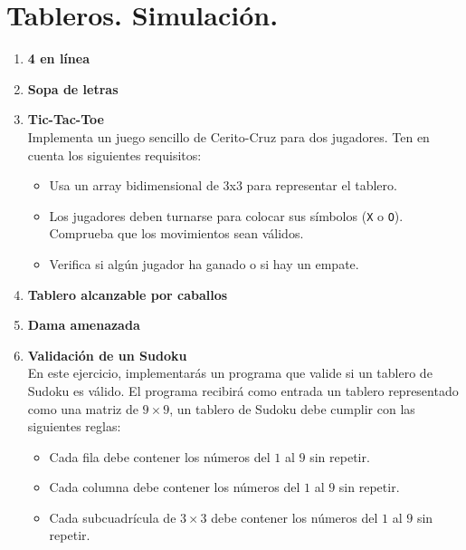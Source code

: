 \section{Tableros. Simulación.}
\begin{enumerate}
    \item \textbf{4 en línea}\\
    

    \item \textbf{Sopa de letras}\\
    

    \item \textbf{Tic-Tac-Toe}\\
    Implementa un juego sencillo de Cerito-Cruz para dos jugadores. Ten en cuenta los siguientes requisitos:
    \begin{itemize}
        \item Usa un array bidimensional de 3x3 para representar el tablero.
        \item Los jugadores deben turnarse para colocar sus símbolos (\texttt{X} o \texttt{O}). Comprueba que los movimientos sean válidos.
        \item Verifica si algún jugador ha ganado o si hay un empate.
    \end{itemize}

    \item \textbf{Tablero alcanzable por caballos}\\
    

    \item \textbf{Dama amenazada}\\
    

    \item \textbf{Validación de un Sudoku}\\
    En este ejercicio, implementarás un programa que valide si un tablero de Sudoku es válido. El programa recibirá como entrada un tablero representado como una matriz de \(9 \times 9\), un tablero de Sudoku debe cumplir con las siguientes reglas:
    \begin{itemize}
        \item Cada fila debe contener los números del \(1\) al \(9\) sin repetir.
        \item Cada columna debe contener los números del \(1\) al \(9\) sin repetir.
        \item Cada subcuadrícula de \(3 \times 3\) debe contener los números del \(1\) al \(9\) sin repetir.
    \end{itemize}


\end{enumerate}
